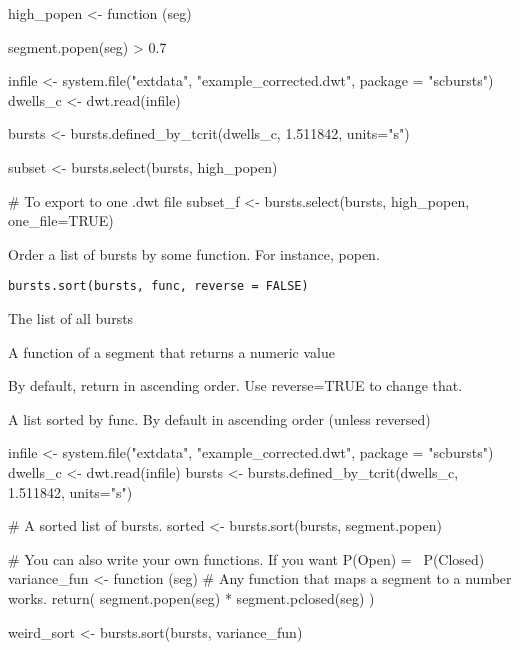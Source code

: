 \documentclass[letterpaper]{book}
\begin{document}
\begin{Examples}
\begin{ExampleCode}

high_popen <- function (seg) {

    segment.popen(seg) > 0.7

}

infile <- system.file("extdata", "example_corrected.dwt", package = "scbursts")
dwells_c <- dwt.read(infile)

bursts <- bursts.defined_by_tcrit(dwells_c, 1.511842, units="s")

subset <- bursts.select(bursts, high_popen)

# To export to one .dwt file
subset_f <- bursts.select(bursts, high_popen, one_file=TRUE)

\end{ExampleCode}
\end{Examples}
%
\begin{Description}\relax
Order a list of bursts by some function. For instance, popen.
\end{Description}
%
\begin{Usage}
\begin{verbatim}
bursts.sort(bursts, func, reverse = FALSE)
\end{verbatim}
\end{Usage}
%
\begin{Arguments}
\begin{ldescription}
\item[\code{bursts}] The list of all bursts

\item[\code{func}] A function of a segment that returns a numeric value

\item[\code{reverse}] By default, return in ascending order. Use reverse=TRUE to change that.
\end{ldescription}
\end{Arguments}
%
\begin{Value}
A list sorted by func. By default in ascending order (unless reversed)
\end{Value}
%
\begin{Examples}
\begin{ExampleCode}

infile <- system.file("extdata", "example_corrected.dwt", package = "scbursts")
dwells_c <- dwt.read(infile)
bursts <- bursts.defined_by_tcrit(dwells_c, 1.511842, units="s")

# A sorted list of bursts. 
sorted <- bursts.sort(bursts, segment.popen)

# You can also write your own functions. If you want P(Open) =~ P(Closed)
variance_fun <- function (seg) {
    # Any function that maps a segment to a number works.
    return(  segment.popen(seg) * segment.pclosed(seg)  )
}

weird_sort <- bursts.sort(bursts, variance_fun)

\end{ExampleCode}
\end{Examples}
\end{document}
